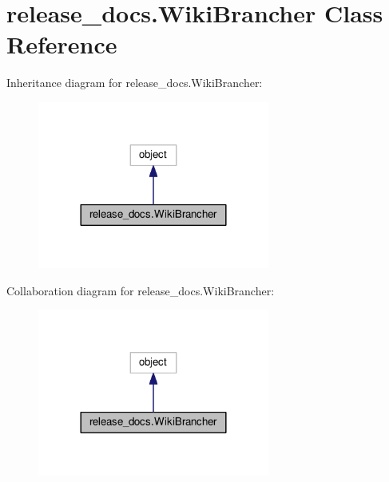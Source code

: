 \hypertarget{classrelease__docs_1_1_wiki_brancher}{}\section{release\+\_\+docs.\+Wiki\+Brancher Class Reference}
\label{classrelease__docs_1_1_wiki_brancher}


Inheritance diagram for release\+\_\+docs.\+Wiki\+Brancher\+:
\nopagebreak
\begin{figure}[H]
\begin{center}
\leavevmode
\includegraphics[width=216pt]{classrelease__docs_1_1_wiki_brancher__inherit__graph}
\end{center}
\end{figure}


Collaboration diagram for release\+\_\+docs.\+Wiki\+Brancher\+:
\nopagebreak
\begin{figure}[H]
\begin{center}
\leavevmode
\includegraphics[width=216pt]{classrelease__docs_1_1_wiki_brancher__coll__graph}
\end{center}
\end{figure}
